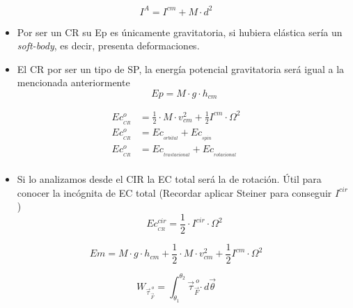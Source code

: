  \begin{equation}
     I^A = I^{cm} + M\cdot d^2
 \end{equation}
 
\begin{itemize}
    \item Por ser un CR su Ep es únicamente gravitatoria, si hubiera elástica sería un \textit{soft-body}, es decir, presenta deformaciones.
    \item El CR por ser un tipo de SP, la energía potencial gravitatoria será igual a la mencionada anteriormente
    \begin{equation}
        Ep = M \cdot g \cdot h_{cm}
    \end{equation}    
\end{itemize}

\begin{equation}
\begin{split}
    Ec_{_{CR}}^{o} & = \frac{1}{2} \cdot M \cdot v_{cm}^2 + \frac{1}{2} I^{cm} \cdot \Omega^2\\
    Ec_{_{CR}}^o & = Ec_{_{orbital}} + Ec_{_{spin}}\\
    Ec_{_{CR}}^o & = Ec_{_{traslacional}} + Ec_{_{rotacional}}\\
\end{split}
\end{equation}
\begin{itemize}
    \item Si lo analizamos desde el CIR la EC total será la de rotación. Útil para conocer la incógnita de EC total (Recordar aplicar Steiner para 
    conseguir $I^{cir}$)
    \begin{equation}
        Ec_{_{CR}}^{cir} = \frac{1}{2} \cdot I^{cir} \cdot \Omega^2
    \end{equation}
\end{itemize}

\begin{equation}
    Em = M \cdot g \cdot h_{cm} + \frac{1}{2} \cdot M \cdot v_{cm}^2 + \frac{1}{2} I^{cm} \cdot \Omega^2
\end{equation}

\begin{equation}
    W_{\Vec{\tau}_{\vec{F}}^{\ o}} = \int_{\theta_1}^{\theta_2} \Vec{\tau}_{\vec{F}}^{\ o}  \boldsymbol{\cdot} \,d\vec{\theta}
\end{equation}

